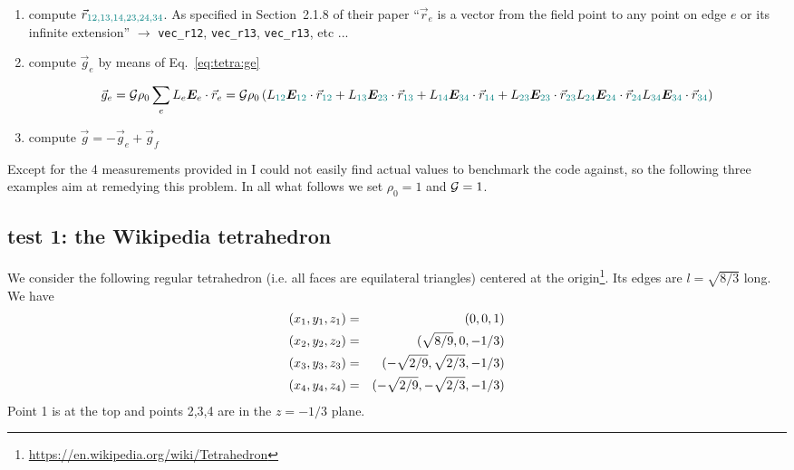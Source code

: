 \begin{enumerate}
\item compute $\vec{r}_{\color{teal}12,13,14,23,24,34}$. As specified in Section~2.1.8 of their paper ``$\vec{r}_e$ is a vector from the field point to any point on edge $e$ or its infinite extension''
$\rightarrow$ \verb|vec_r12|, \verb|vec_r13|, \verb|vec_r13|, etc ...  


\item compute $\vec{g}_e$ by means of Eq.~\eqref{eq:tetra:ge}

\[
\vec{g}_e 
={\cal G} \rho_0 \sum_e L_e {\bm E}_e \cdot \vec{r}_e 
={\cal G} \rho_0 \left( 
L_{\color{teal}12} {\bm E}_{\color{teal}12}\cdot\vec{r}_{\color{teal}12} +
L_{\color{teal}13} {\bm E}_{\color{teal}23}\cdot\vec{r}_{\color{teal}13} +
L_{\color{teal}14} {\bm E}_{\color{teal}34}\cdot\vec{r}_{\color{teal}14} +
L_{\color{teal}23} {\bm E}_{\color{teal}23}\cdot\vec{r}_{\color{teal}23} 
L_{\color{teal}24} {\bm E}_{\color{teal}24}\cdot\vec{r}_{\color{teal}24} 
L_{\color{teal}34} {\bm E}_{\color{teal}34}\cdot\vec{r}_{\color{teal}34} 
\right)
\]


\item compute $\vec{g}=-\vec{g}_e+\vec{g}_f$

\end{enumerate}

Except for the 4 measurements provided in \textcite{mequ86} I could not easily find 
actual values to benchmark the code against, so the following three examples aim at 
remedying this problem. 
In all what follows we set $\rho_0=1$ and ${\cal G}=1$.

\subsection*{test 1: the Wikipedia tetrahedron}

We consider the following regular tetrahedron (i.e. all faces are equilateral triangles) centered at the 
origin\footnote{\url{https://en.wikipedia.org/wiki/Tetrahedron}}. Its edges are $l=\sqrt{8/3}$ long.
We have
\begin{eqnarray}
(x_1,y_1,z_1) &=& (0,0,1) \nonumber\\
(x_2,y_2,z_2) &=& (\sqrt{8/9},0,-1/3) \nonumber\\
(x_3,y_3,z_3) &=& (-\sqrt{2/9},\sqrt{2/3},-1/3) \nonumber\\
(x_4,y_4,z_4) &=& (-\sqrt{2/9},-\sqrt{2/3},-1/3) \nonumber
\end{eqnarray}
Point 1 is at the top and points 2,3,4 are in the $z=-1/3$ plane.

